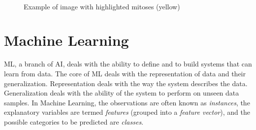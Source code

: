\begin{figure}[!hbt]
 \centering
  \\
  \caption{Example of image with highlighted mitoses (yellow) }
  \label{ch2:fig3}
\end{figure}


\section{Machine Learning}
\label{ch2:ML}

\Gls{ML}, a branch of \Gls{AI}, deals with the ability to define and to build systems that can learn from data.
The core of \Gls{ML} deals with the representation of data and their generalization. Representation deals with the way the system describes the data.
Generalization deals with the ability of the system to perform on unseen data samples.
In Machine Learning, the observations are often known as \textit{instances},
the explanatory variables are termed \textit{features} (grouped into a \textit{feature vector}), and the possible categories to be predicted are \textit{classes}. 


